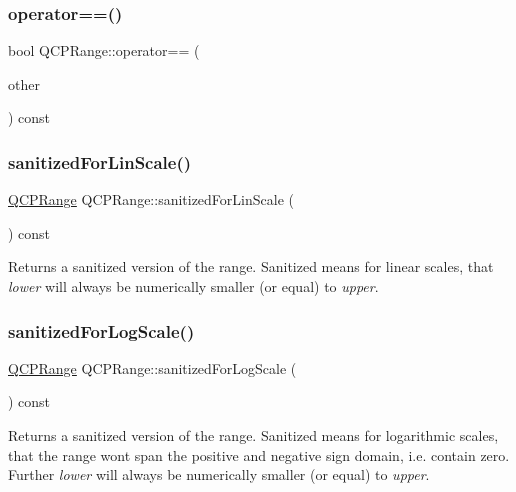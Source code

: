 \subsubsection{\texorpdfstring{operator==()}{operator==()}}
{\footnotesize\ttfamily bool Q\+C\+P\+Range\+::operator== (\begin{DoxyParamCaption}\item[{const \hyperlink{class_q_c_p_range}{Q\+C\+P\+Range} \&}]{other }\end{DoxyParamCaption}) const\hspace{0.3cm}{\ttfamily [inline]}}

\mbox{\label{class_q_c_p_range_a808751fdd9b17ef52327ba011df2e5f1}} 
\subsubsection{\texorpdfstring{sanitized\+For\+Lin\+Scale()}{sanitizedForLinScale()}}
{\footnotesize\ttfamily \hyperlink{class_q_c_p_range}{Q\+C\+P\+Range} Q\+C\+P\+Range\+::sanitized\+For\+Lin\+Scale (\begin{DoxyParamCaption}{ }\end{DoxyParamCaption}) const}

Returns a sanitized version of the range. Sanitized means for linear scales, that {\itshape lower} will always be numerically smaller (or equal) to {\itshape upper}. \mbox{\label{class_q_c_p_range_a3d66288d66e1d6df3636075eb42502ee}} 
\subsubsection{\texorpdfstring{sanitized\+For\+Log\+Scale()}{sanitizedForLogScale()}}
{\footnotesize\ttfamily \hyperlink{class_q_c_p_range}{Q\+C\+P\+Range} Q\+C\+P\+Range\+::sanitized\+For\+Log\+Scale (\begin{DoxyParamCaption}{ }\end{DoxyParamCaption}) const}

Returns a sanitized version of the range. Sanitized means for logarithmic scales, that the range won\textquotesingle{}t span the positive and negative sign domain, i.\+e. contain zero. Further {\itshape lower} will always be numerically smaller (or equal) to {\itshape upper}.


